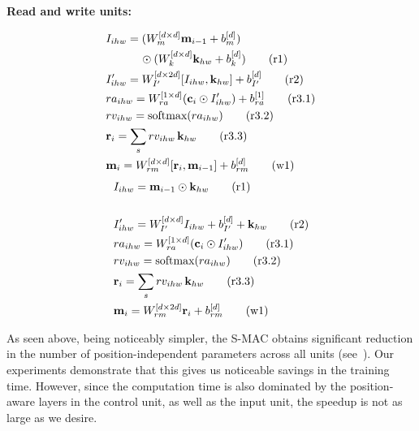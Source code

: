 \noindent\textbf{Read and write units:}
\begin{multicols}{2}
	\noindent
	\begin{align*}
	&I_{ihw} = (W_{m}^{[d \times d]} \mathbf{m}_{i-1} + b_{m}^{[d]}) \\
	           & \qquad \quad \odot (W_{k}^{[d \times d]} \mathbf{k}_{hw} + b_{k}^{[d]}) \tag{r1} \\
	&I'_{ihw} =  W_{I'}^{[d \times 2d]} [I_{ihw},\mathbf{k}_{hw}]  + b_{I'}^{[d]}  \tag{r2} \\
	&ra_{ihw} = W_{ra}^{[1 \times d]} (\mathbf{c}_i \odot I'_{ihw}) + b_{ra}^{[1]} \tag{r3.1}\\
	&rv_{ihw} = \textrm{softmax}(ra_{ihw}) \tag{r3.2}\\
	&\mathbf{r}_i = \sum_s rv_{ihw} \, \mathbf{k}_{hw}  \tag{r3.3}\\
	&\mathbf{m}_i = W_{rm}^{[d \times d]} [\mathbf{r}_i, \mathbf{m}_{i-1}]  + b_{rm}^{[d]} \tag{w1}	
	\end{align*}
	\columnbreak
	{\color{Plum}
	\begin{align*}
	&I_{ihw} = \mathbf{m}_{i-1} \odot \mathbf{k}_{hw} \tag{r1} \\ \\
	&I'_{ihw} = W_{I'}^{[d \times d]} I_{ihw} + b_{I'}^{[d]} + \mathbf{k}_{hw} \tag{r2} \\
	&ra_{ihw} = W_{ra}^{[1 \times d]} (\mathbf{c}_i \odot I'_{ihw})  \tag{r3.1}\\
	&rv_{ihw} = \textrm{softmax}(ra_{ihw}) \tag{r3.2}\\
	&\mathbf{r}_i = \sum_s rv_{ihw} \, \mathbf{k}_{hw}  \tag{r3.3}\\
	&\mathbf{m}_i = W_{rm}^{[d \times 2d]} \mathbf{r}_i + b_{rm}^{[d]} \tag{w1}
	\end{align*}}
\end{multicols}

As seen above, being noticeably simpler, the S-MAC obtains significant reduction in the number of position-independent parameters across all units (see~).
Our experiments demonstrate that this gives us noticeable savings in the training time. However, since the computation time is also dominated by the position-aware layers in the control unit, as well as the input unit, the speedup is not as large as we desire.